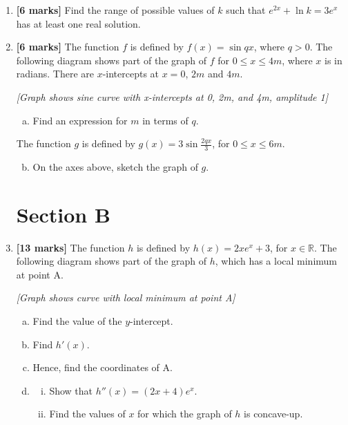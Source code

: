\documentclass[12pt, twoside]{article}
\begin{document}
\begin{enumerate}
\vspace{1cm}

\item \textbf{[6 marks]} Find the range of possible values of $k$ such that $e^{2x} + \ln k = 3e^x$ has at least one real solution.

\vspace{1cm}

\item \textbf{[6 marks]} The function $f$ is defined by $f(x) = \sin qx$, where $q > 0$. The following diagram shows part of the graph of $f$ for $0 \leq x \leq 4m$, where $x$ is in radians. There are $x$-intercepts at $x = 0$, $2m$ and $4m$.

\begin{center}
\textit{[Graph shows sine curve with x-intercepts at 0, 2m, and 4m, amplitude 1]}
\end{center}

    \begin{enumerate}[(a)]
        \item Find an expression for $m$ in terms of $q$.
    \end{enumerate}
    
    The function $g$ is defined by $g(x) = 3\sin\frac{2qx}{3}$, for $0 \leq x \leq 6m$.
    
    \begin{enumerate}[(a)]
        \setcounter{enumii}{1}
        \item On the axes above, sketch the graph of $g$.
    \end{enumerate}

\newpage

\section*{Section B}

\setcounter{enumi}{6}

\item \textbf{[13 marks]} The function $h$ is defined by $h(x) = 2xe^x + 3$, for $x \in \mathbb{R}$. The following diagram shows part of the graph of $h$, which has a local minimum at point A.

\begin{center}
\textit{[Graph shows curve with local minimum at point A]}
\end{center}

    \begin{enumerate}[(a)]
        \item Find the value of the $y$-intercept.
        \item Find $h'(x)$.
        \item Hence, find the coordinates of A.
        \item \begin{enumerate}[(i)]
            \item Show that $h''(x) = (2x + 4)e^x$.
            \item Find the values of $x$ for which the graph of $h$ is concave-up.
        \end{enumerate}
    \end{enumerate}


\end{enumerate}
\end{document}
